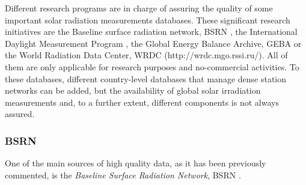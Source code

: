 Different research programs are in charge of assuring the quality of some important solar radiation measurements databases. These significant research initiatives are the Baseline surface radiation network, BSRN \cite*{Konig-Langlo2013}, the International Daylight Measurement Program \cite*{dumortier1999status}, the Global Energy Balance Archive, GEBA \cite*{Gilgen1998} or the World Radiation Data Center, WRDC (http://wrdc.mgo.rssi.ru/). All of them are only applicable for research purposes and no-commercial activities. To these databases, different country-level databases that manage dense station networks can be added, but the availability of global solar irradiation measurements and, to a further extent, different components is not always assured.


\subsubsection{BSRN}

One of the main sources of high quality data, as it has been previously commented, is the \textit{Baseline Surface Radiation Network}, BSRN \cite*{Konig-Langlo2013}. %

